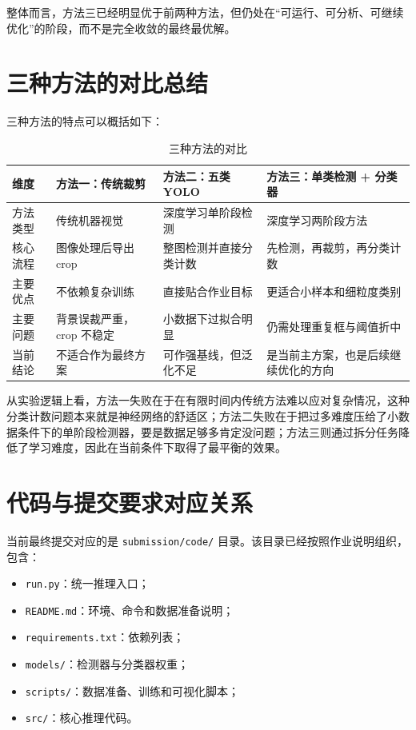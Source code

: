 \documentclass[12pt,a4paper]{ctexart}
\begin{document}
整体而言，方法三已经明显优于前两种方法，但仍处在“可运行、可分析、可继续优化”的阶段，而不是完全收敛的最终最优解。

\section{三种方法的对比总结}

三种方法的特点可以概括如下：

\begin{table}[H]
    \centering
    \caption{三种方法的对比}
    \label{tab:three_methods_compare_main}
    \begin{tabular}{p{2.5cm}p{3.8cm}p{3.8cm}p{4.0cm}}
        \toprule
        维度 & 方法一：传统裁剪 & 方法二：五类 YOLO & 方法三：单类检测 + 分类器 \\
        \midrule
        方法类型 & 传统机器视觉 & 深度学习单阶段检测 & 深度学习两阶段方法 \\
        核心流程 & 图像处理后导出 crop & 整图检测并直接分类计数 & 先检测，再裁剪，再分类计数 \\
        主要优点 & 不依赖复杂训练 & 直接贴合作业目标 & 更适合小样本和细粒度类别 \\
        主要问题 & 背景误裁严重，crop 不稳定 & 小数据下过拟合明显 & 仍需处理重复框与阈值折中 \\
        当前结论 & 不适合作为最终方案 & 可作强基线，但泛化不足 & 是当前主方案，也是后续继续优化的方向 \\
        \bottomrule
    \end{tabular}
\end{table}

从实验逻辑上看，方法一失败在于在有限时间内传统方法难以应对复杂情况，这种分类计数问题本来就是神经网络的舒适区；方法二失败在于把过多难度压给了小数据条件下的单阶段检测器，要是数据足够多肯定没问题；方法三则通过拆分任务降低了学习难度，因此在当前条件下取得了最平衡的效果。

\section{代码与提交要求对应关系}

当前最终提交对应的是 \texttt{submission/code/} 目录。该目录已经按照作业说明组织，包含：
\begin{itemize}
    \item \texttt{run.py}：统一推理入口；
    \item \texttt{README.md}：环境、命令和数据准备说明；
    \item \texttt{requirements.txt}：依赖列表；
    \item \texttt{models/}：检测器与分类器权重；
    \item \texttt{scripts/}：数据准备、训练和可视化脚本；
    \item \texttt{src/}：核心推理代码。
\end{itemize}
\end{document}
